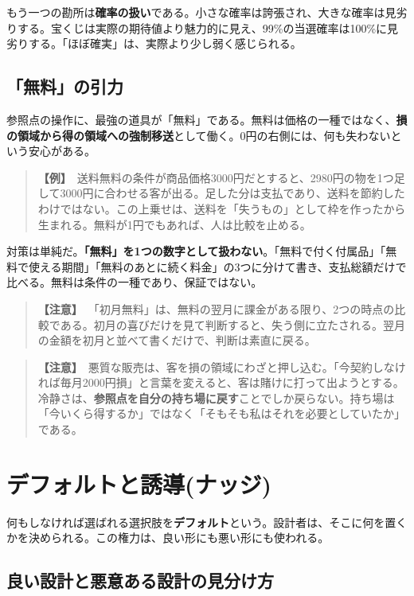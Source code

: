 \documentclass{article}
\begin{document}
もう一つの勘所は\textbf{確率の扱い}である。小さな確率は誇張され、大きな確率は見劣りする。宝くじは実際の期待値より魅力的に見え、99\%の当選確率は100\%に見劣りする。「ほぼ確実」は、実際より少し弱く感じられる。

\subsection{「無料」の引力}

参照点の操作に、最強の道具が「無料」である。無料は価格の一種ではなく、\textbf{損の領域から得の領域への強制移送}として働く。0円の右側には、何も失わないという安心がある。

\begin{quote}
\textbf{【例】}\ 送料無料の条件が商品価格3000円だとすると、2980円の物を1つ足して3000円に合わせる客が出る。足した分は支払であり、送料を節約したわけではない。この上乗せは、送料を「失うもの」として枠を作ったから生まれる。無料が1円でもあれば、人は比較を止める。
\end{quote}

対策は単純だ。\textbf{「無料」を1つの数字として扱わない}。「無料で付く付属品」「無料で使える期間」「無料のあとに続く料金」の3つに分けて書き、支払総額だけで比べる。無料は条件の一種であり、保証ではない。

\begin{quote}
\textbf{【注意】}\ 「初月無料」は、無料の翌月に課金がある限り、2つの時点の比較である。初月の喜びだけを見て判断すると、失う側に立たされる。翌月の金額を初月と並べて書くだけで、判断は素直に戻る。
\end{quote}

\begin{quote}
\textbf{【注意】}\ 悪質な販売は、客を損の領域にわざと押し込む。「今契約しなければ毎月2000円損」と言葉を変えると、客は賭けに打って出ようとする。冷静さは、\textbf{参照点を自分の持ち場に戻す}ことでしか戻らない。持ち場は「今いくら得するか」ではなく「そもそも私はそれを必要としていたか」である。
\end{quote}

\section{デフォルトと誘導(ナッジ)}

何もしなければ選ばれる選択肢を\textbf{デフォルト}という。設計者は、そこに何を置くかを決められる。この権力は、良い形にも悪い形にも使われる。

\subsection{良い設計と悪意ある設計の見分け方}
\end{document}
